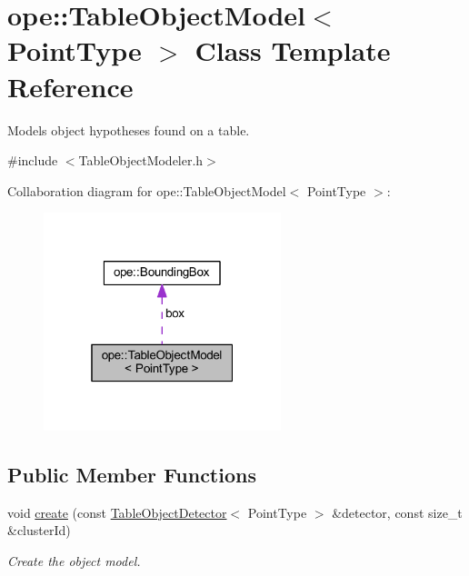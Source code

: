 \hypertarget{classope_1_1_table_object_model}{\section{ope\-:\-:Table\-Object\-Model$<$ Point\-Type $>$ Class Template Reference}
\label{classope_1_1_table_object_model}
}


Models object hypotheses found on a table.  




{\ttfamily \#include $<$Table\-Object\-Modeler.\-h$>$}



Collaboration diagram for ope\-:\-:Table\-Object\-Model$<$ Point\-Type $>$\-:
\nopagebreak
\begin{figure}[H]
\begin{center}
\leavevmode
\includegraphics[width=196pt]{classope_1_1_table_object_model__coll__graph}
\end{center}
\end{figure}
\subsection*{Public Member Functions}
\begin{DoxyCompactItemize}
\item 
\hypertarget{classope_1_1_table_object_model_a1629e063503b9d8c9add730c898d08be}{void \hyperlink{classope_1_1_table_object_model_a1629e063503b9d8c9add730c898d08be}{create} (const \hyperlink{classope_1_1_table_object_detector}{Table\-Object\-Detector}$<$ Point\-Type $>$ \&detector, const size\-\_\-t \&cluster\-Id)}\label{classope_1_1_table_object_model_a1629e063503b9d8c9add730c898d08be}

\begin{DoxyCompactList}\small\item\em Create the object model. \end{DoxyCompactList}\end{DoxyCompactItemize}
